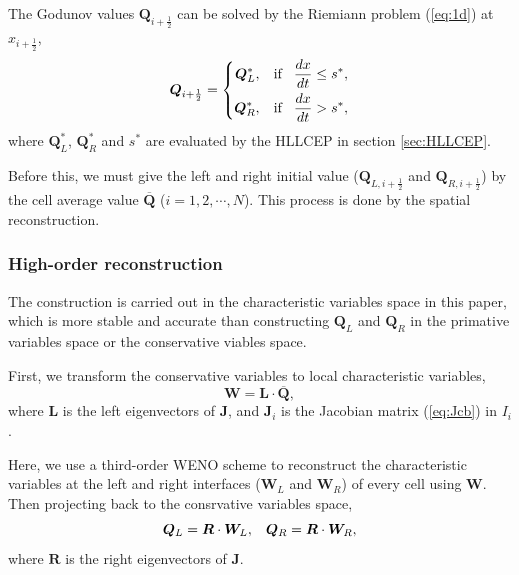 \documentclass{article}
\numberwithin{equation}{section}
\numberwithin{table}{section}
\begin{document}
The Godunov values  $\bm{Q}_{i+\frac{1}{2}}$  can be solved  by the Riemiann problem  (\ref{eq:1d}) at $x_{i+\frac{1}{2}}$, 
\begin{equation}
  \bm{Q}_{i+\frac{1}{2}} = \left\{ \begin{aligned}
	\bm{Q}_L^*, \hspace{0.3cm} \text{if} \hspace{0.3cm} \frac{dx}{dt} \le  s^*,\\
	\bm{Q}_R^*, \hspace{0.3cm} \text{if} \hspace{0.3cm} \frac{dx}{dt} > s^*,\\
  \end{aligned} \right.
\end{equation}
where $\bm{Q}_L^*$, $\bm{Q}_R^*$ and $s^*$ are evaluated by the HLLCEP in section \ref{sec:HLLCEP}.

Before this, we must give the left  and right initial value ($\bm{Q}_{L,i+\frac{1}{2}}$ and $\bm{Q}_{R,i+\frac{1}{2}}$) by the cell average value $\overline{\bm{Q}}$ ($i = 1,2,\cdots,N$). This process is done by the spatial reconstruction.

\subsubsection{High-order reconstruction} 
The construction is carried out in the characteristic variables  space in this paper, which is   more stable  and accurate  than constructing  $\bm{Q}_L$ and $\bm{Q}_R$ in the primative variables space or the conservative viables space.

First, we transform the conservative variables to local characteristic variables,
\begin{equation}
  \bm{W} = \bm{L} \cdot \overline{\bm{Q}},
\end{equation}
where $\bm{L}$ is the left eigenvectors of $\bm{J}$, and $\bm{J}_i$ is the Jacobian matrix  (\ref{eq:Jcb}) in $I_i$. 

Here, we  use a third-order WENO scheme to reconstruct the characteristic variables at the  left and right interfaces ($\bm{W}_L$ and $\bm{W}_R$)  of every cell using  $\bm{W}$. Then projecting  back to the consrvative variables space, 
\begin{equation}
  \bm{Q}_L = \bm{R} \cdot \bm{W}_L, \hspace{0.3cm}   \bm{Q}_R = \bm{R} \cdot \bm{W}_R,
\end{equation}
where $\bm{R}$ is the right eigenvectors of $\bm{J}$.
\end{document}
